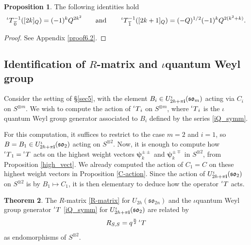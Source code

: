\documentclass[10pt]{amsart}
\numberwithin{equation}{section}
\theoremstyle{definition}
\newtheorem{theorem}{Theorem}[section]
\newtheorem{proposition}[theorem]{Proposition}
\newcommand{\son}[1][2n]{\mathfrak{so}_{#1}}
\newcommand{\ot}{\otimes}
\newcommand{\iQW}{\prescript{\iota}{}{T}}
\newcommand{\hwp}{\boldsymbol{\psi}}
\begin{document}
\begin{proposition}\label{i-q_gens}
    The following identities hold
    \begin{equation}
    \iQW_{\overline{0}}^{-1}([2k]_Q)=(-1)^k Q^{2k^2} \qquad \text{and} \qquad \iQW_{\overline{1}}^{-1}([2k+1]_Q)=(-Q)^{1/2} (-1)^kQ^{2(k^2+k)}.
\end{equation}
\end{proposition}
\begin{proof}
    See Appendix \ref{proof6.2}.
\end{proof}

\subsection{Identification of $R$-matrix and $\iota$quantum Weyl group}

Consider the setting of \S\ref{sec5}, with the element $B_i\in U_{2h+\pi{\bf i}}^\iota (\mathfrak{so}_m)$ acting via $C_i$ on $S^{\ot m}$. We wish to compute the action of $\iQW_i$ on $S^{\otimes m}$, where $\iQW_i$ is the $\iota$quantum Weyl group generator associated to $B_i$ defined by the series \eqref{iQ_symm}. 

For this computation, it suffices to restrict to the case $m=2$ and $i=1$, so $B=B_1\in U_{2h+\pi{\bf i}}^\iota (\mathfrak{so}_2)$ acting on $S^{\otimes 2}$. Now, it is enough to compute how $\iQW_1=\iQW$ acts on the highest weight vectors $\hwp_k^{\pm\pm}$ and $\hwp_k^{\pm\mp}$ in $S^{\otimes 2}$, from Proposition \ref{high_vect}. We already computed the action of $C_1=C$ on these highest weight vectors in Proposition \ref{C-action}. Since the action of $U_{2h+\pi{\bf i}}^\iota (\mathfrak{so}_2)$ on $S^{\otimes 2}$ is by $B_1\mapsto C_1$, it is then elementary to deduce how the operator $\iQW$ acts.


\begin{theorem}\label{R-matrix-to-i-q-Weyl}
The $R$-matrix \eqref{R-matrix} for $U_{2h}(\son)$ and the $\iota$quantum Weyl group generator $\iQW$ \eqref{iQ_symm} for $U_{2h+\pi{\bf i}}^\iota (\mathfrak{so}_2)$ are related by
\begin{equation}\label{R_iQW_comp}
    R_{S,S}=q^{\frac{n}{2}} \iQW
\end{equation}
as endomorphisms of $S^{\ot 2}$.
\end{theorem}
\end{document}
